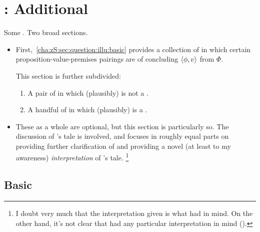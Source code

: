 \chapter{: Additional }
\label{cha:zS:sec:question:illu}

\begin{note}
  Some .
  Two broad sections.

  \begin{itemize}
  \item
    First,~\autoref{cha:zS:sec:question:illu:basic} provides a collection of  in which certain proposition-value-premises pairings are  of concluding \(\langle \phi, v \rangle\) from \(\Phi\).

    This section is further subdivided:
    \begin{enumerate}[label=]
    \item

      A pair of  in which \requ{} (plausibly) is not a \fc{}.
    \item

      A handful of  in which \requ{} (plausibly) is a \fc{}.

    \end{enumerate}
  \item
    These  as a whole are optional, but this section is particularly so.
    The discussion of \citeauthor{Carroll:1895uj}'s tale is involved, and focuses in roughly equal parts on providing further clarification of  and providing a novel (at least to my awareness) \emph{interpretation} of \citeauthor{Carroll:1895uj}'s tale.%
    \footnote{
      I doubt very much that the interpretation given is what \citeauthor{Carroll:1895uj} had in mind.
      On the other hand, it's not clear that \citeauthor{Carroll:1895uj} had any particular interpretation in mind (\cite[Cf.][]{Thomson:2010tt}).
    }
  \end{itemize}
\end{note}

\section{Basic }
\label{cha:zS:sec:question:illu:basic}


